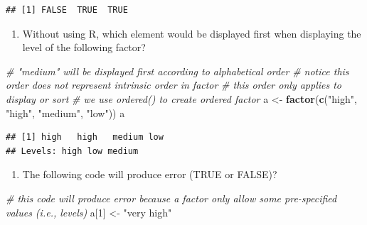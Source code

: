 \documentclass[]{book}
\newenvironment{Shaded}{\begin{snugshade}}{\end{snugshade}}
\newcommand{\CommentTok}[1]{\textcolor[rgb]{0.56,0.35,0.01}{\textit{#1}}}
\newcommand{\DecValTok}[1]{\textcolor[rgb]{0.00,0.00,0.81}{#1}}
\newcommand{\KeywordTok}[1]{\textcolor[rgb]{0.13,0.29,0.53}{\textbf{#1}}}
\newcommand{\NormalTok}[1]{#1}
\newcommand{\StringTok}[1]{\textcolor[rgb]{0.31,0.60,0.02}{#1}}
\providecommand{\tightlist}{%
  \setlength{\itemsep}{0pt}\setlength{\parskip}{0pt}}
\begin{document}
\begin{verbatim}
## [1] FALSE  TRUE  TRUE
\end{verbatim}

\begin{enumerate}
\def\labelenumi{\arabic{enumi}.}
\setcounter{enumi}{8}
\tightlist
\item
  Without using R, which element would be displayed first when displaying the level of the following factor?
\end{enumerate}

\begin{Shaded}
\begin{Highlighting}[]
\CommentTok{# "medium" will be displayed first according to alphabetical order}
\CommentTok{# notice this order does not represent intrinsic order in factor}
\CommentTok{# this order only applies to display or sort}
\CommentTok{# we use ordered() to create ordered factor}
\NormalTok{a <-}\StringTok{ }\KeywordTok{factor}\NormalTok{(}\KeywordTok{c}\NormalTok{(}\StringTok{"high"}\NormalTok{, }\StringTok{"high"}\NormalTok{, }\StringTok{"medium"}\NormalTok{, }\StringTok{"low"}\NormalTok{))}
\NormalTok{a}
\end{Highlighting}
\end{Shaded}

\begin{verbatim}
## [1] high   high   medium low   
## Levels: high low medium
\end{verbatim}

\begin{enumerate}
\def\labelenumi{\arabic{enumi}.}
\setcounter{enumi}{9}
\tightlist
\item
  The following code will produce error (TRUE or FALSE)?
\end{enumerate}

\begin{Shaded}
\begin{Highlighting}[]
\CommentTok{# this code will produce error because a factor only allow some pre-specified values (i.e., levels)}
\NormalTok{a[}\DecValTok{1}\NormalTok{] <-}\StringTok{ "very high"}
\end{Highlighting}
\end{Shaded}


\end{document}
